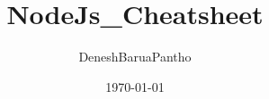 \documentclass{article}
\begin{document}
\title{NodeJs_Cheatsheet}
\author{DeneshBaruaPantho}
\date{\today} %
\maketitle
\end{document}
